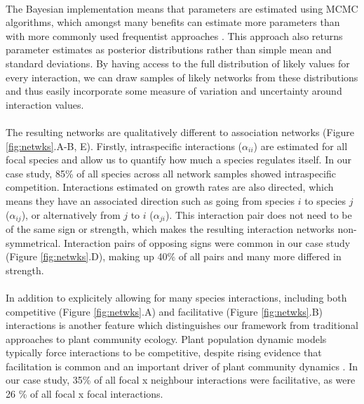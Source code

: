 \documentclass[a4,12pt]{article}
\begin{document}
    \paragraph{}
    The Bayesian implementation means that parameters are estimated using MCMC algorithms, which amongst many benefits can estimate more parameters than with more commonly used frequentist approaches \citep{Dorazio2016}. This approach also returns parameter estimates as posterior distributions rather than simple mean and standard deviations. By having access to the full distribution of likely values for every interaction, we can draw samples of likely networks from these distributions and thus easily incorporate some measure of variation and uncertainty around interaction values. %


    \paragraph{}
    The resulting networks are qualitatively different to association networks (Figure \ref{fig:netwks}.A-B, E). Firstly, intraspecific interactions ($\alpha_{ii}$) are estimated for all focal species and allow us to quantify how much a species regulates itself. In our case study, 85\% of all species across all network samples showed intraspecific competition. Interactions estimated on growth rates are also directed, which means they have an associated direction such as going from species $i$ to species $j$ ($\alpha_{ij}$), or alternatively from $j$ to $i$ ($\alpha_{ji}$). This interaction pair does not need to be of the same sign or strength, which makes the resulting interaction networks non-symmetrical. Interaction pairs of opposing signs were common in our case study (Figure \ref{fig:netwks}.D), making up 40\% of all pairs and many more differed in strength. 

    \paragraph{}
    In addition to explicitely allowing for many species interactions, including both competitive (Figure \ref{fig:netwks}.A) and facilitative (Figure \ref{fig:netwks}.B) interactions is another feature which distinguishes our framework from traditional approaches to plant community ecology. Plant population dynamic models typically force interactions to be competitive, despite rising evidence that facilitation is common and an important driver of plant community dynamics \citep{Brooker2008a}. In our case study, 35\% of all focal x neighbour interactions were facilitative, as were 26 \% of all focal x focal interactions.
\end{document}
